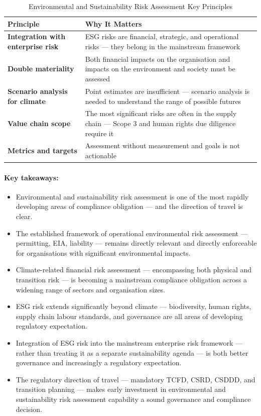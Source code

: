 \begin{table}[H]
  \centering
  \renewcommand{\arraystretch}{1.5}
  \begin{tabularx}{\textwidth}{ | >{\raggedright\arraybackslash}p{} 
                                | >{\raggedright\arraybackslash}X | }
    \hline
    \textbf{Principle} & \textbf{Why It Matters} \\
    \hline
    \textbf{Integration with enterprise risk} & ESG risks are financial, strategic, and operational risks — they belong in the mainstream framework\\
    \hline
    \textbf{Double materiality} & Both financial impacts on the organisation and impacts on the environment and society must be assessed\\
    \hline
    \textbf{Scenario analysis for climate} & Point estimates are insufficient — scenario analysis is needed to understand the range of possible futures\\
    \hline
    \textbf{Value chain scope} & The most significant risks are often in the supply chain — Scope 3 and human rights due diligence require it\\
    \hline
    \textbf{Metrics and targets} & Assessment without measurement and goals is not actionable\\
    \hline
  \end{tabularx}
  \caption{Environmental and Sustainability Risk Assessment Key Principles}
\end{table}

\paragraph{Key takeaways:}
\begin{itemize}
  \item{Environmental and sustainability risk assessment is one of the most rapidly developing areas of compliance obligation — and the direction of travel is clear.}
  \item{The established framework of operational environmental risk assessment — permitting, EIA, liability — remains directly relevant and directly enforceable for organisations with significant environmental impacts.}
  \item{Climate-related financial risk assessment — encompassing both physical and transition risk — is becoming a mainstream compliance obligation across a widening range of sectors and organisation sizes.}
  \item{ESG risk extends significantly beyond climate — biodiversity, human rights, supply chain labour standards, and governance are all areas of developing regulatory expectation.}
  \item{Integration of ESG risk into the mainstream enterprise risk framework — rather than treating it as a separate sustainability agenda — is both better governance and increasingly a regulatory expectation.}
  \item{The regulatory direction of travel — mandatory TCFD, CSRD, CSDDD, and transition planning — makes early investment in environmental and sustainability risk assessment capability a sound governance and compliance decision.}
\end{itemize}

